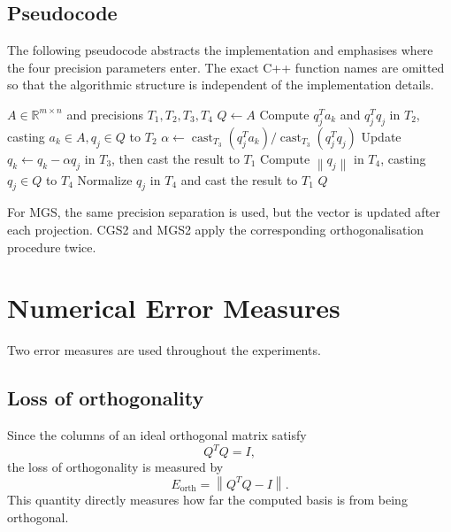\documentclass[a4paper,11pt]{article}
\newcommand{\norm}[1]{\left\lVert #1 \right\rVert}
\begin{document}
\subsection{Pseudocode}

The following pseudocode abstracts the implementation and emphasises where
the four precision parameters enter. The exact C++ function names are omitted
so that the algorithmic structure is independent of the implementation
details.

\begin{algorithm}[H]
\caption{Mixed-Precision Classical Gram--Schmidt}
\label{alg:cgs-mixed}
\begin{algorithmic}[1]
\Require $A\in\mathbb{R}^{m\times n}$ and precisions $T_1,T_2,T_3,T_4$
\State $Q\gets A$ 
        \State Compute $q_j^Ta_k$ and $q_j^Tq_j$ in $T_2$,
        casting $a_k \in A, q_j \in Q$ to $T_2$
        \State $\alpha\gets
        \operatorname{cast}_{T_3}(q_j^Ta_k)/
        \operatorname{cast}_{T_3}(q_j^Tq_j)$
        \State Update $q_k\gets q_k-\alpha q_j$ in $T_3$,
        then cast the result to $T_1$
    \EndFor
\EndFor
{}
    \State Compute $\norm{q_j}$ in $T_4$, casting $q_j \in Q$ to $T_4$
    \State Normalize $q_j$ in $T_4$ and cast the result to $T_1$
\EndFor
\State \Return $Q$
\end{algorithmic}
\end{algorithm}

For MGS, the same precision separation is used, but the vector is updated
after each projection. CGS2 and MGS2 apply the corresponding orthogonalisation
procedure twice.

\section{Numerical Error Measures}

Two error measures are used throughout the experiments.

\subsection{Loss of orthogonality}

Since the columns of an ideal orthogonal matrix satisfy
\[
    Q^TQ=I,
\]
the loss of orthogonality is measured by
\[
    E_{\mathrm{orth}}
    =
    \norm{Q^TQ-I}.
\]
This quantity directly measures how far the computed basis is from being
orthogonal.
\end{document}
